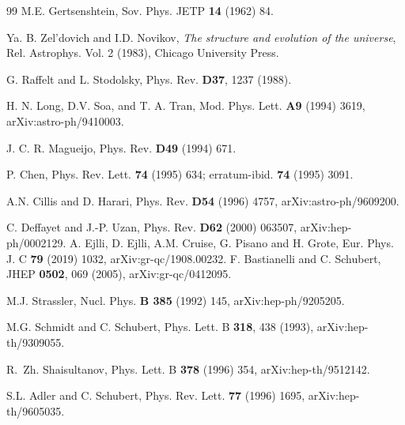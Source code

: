 \documentclass[a4paper,11pt]{article}
\begin{document}
\begin{thebibliography}{99}
M.E. Gertsenshtein, Sov. Phys. JETP {\bf 14} (1962) 84.



Ya. B. Zel'dovich and I.D. Novikov, {\it The structure and evolution of the
universe}, Rel. Astrophys. Vol. 2 (1983), Chicago University Press.

G. Raffelt and L. Stodolsky, Phys. Rev. {\bf D37}, 1237 (1988).

H. N. Long, D.V. Soa, and T. A. Tran, Mod. Phys. Lett. {\bf A9} (1994) 3619,
arXiv:astro-ph/9410003.

J. C. R. Magueijo, Phys. Rev. {\bf D49} (1994) 671.

P. Chen, Phys. Rev. Lett. {\bf 74} (1995) 634;
erratum-ibid. {\bf 74} (1995) 3091.

A.N. Cillis and D. Harari, Phys. Rev. {\bf D54} (1996) 4757,
arXiv:astro-ph/9609200.

C. Deffayet and J.-P. Uzan, Phys. Rev. {\bf D62} (2000) 063507,
arXiv:hep-ph/0002129.
A. Ejlli, D. Ejlli, A.M. Cruise, G. Pisano and H. Grote,
Eur. Phys. J. C {\bf 79} (2019) 1032, arXiv:gr-qc/1908.00232. 
F. Bastianelli and C. Schubert,
JHEP {\bf 0502}, 069 (2005), arXiv:gr-qc/0412095.  

M.J. Strassler, Nucl. Phys. {\bf B 385} (1992) 145, arXiv:hep-ph/9205205.

M.G. Schmidt and C. Schubert, 
Phys. Lett. B {\bf 318}, 438 (1993), arXiv:hep-th/9309055. 


R.~Zh. Shaisultanov, 
Phys. Lett. B {\bf 378} (1996) 354, arXiv:hep-th/9512142.



S.L. Adler and  C. Schubert, 
Phys. Rev. Lett. {\bf 77} (1996) 1695, arXiv:hep-th/9605035.



\end{thebibliography}
\end{document}

